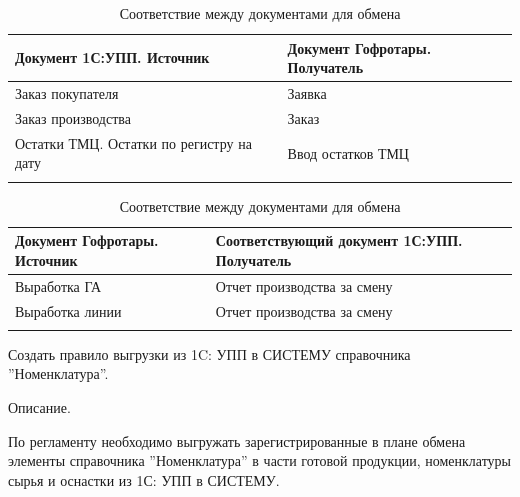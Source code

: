 \begin{longtable}{|p{70mm}|p{70mm}|}
\hline
\parbox[c][19mm]{55mm}{\centering Документ 1С:УПП. Источник} & \parbox[c]{55mm}{\centering Документ Гофротары. Получатель}  \\
\hline
\parbox[c][6mm]{60mm}{Заказ покупателя} & Заявка \\
\hline
\parbox[c][6mm]{60mm}{Заказ производства} & Заказ  \\
\hline
\parbox[c][12mm]{60mm}{Остатки ТМЦ. Остатки по регистру на дату} & Ввод остатков ТМЦ  \\
\hline
\caption{Соответствие между документами для обмена}\label{tab:exchange2}
\end{longtable}  
\normalsize




\begin{longtable}{|p{70mm}|p{70mm}|}
\hline
\parbox[c][19mm]{55mm}{\centering Документ Гофротары. Источник} & \parbox[c]{55mm}{\centering Соответствующий документ 1С:УПП. Получатель}  \\
\hline
\parbox[c][6mm]{60mm}{Выработка ГА} & Отчет производства за смену \\
\hline
\parbox[c][6mm]{60mm}{Выработка линии} & Отчет производства за смену \\
\hline
\caption{Соответствие между документами для обмена}\label{tab:exchange3}
\end{longtable}  
\normalsize










Создать правило выгрузки из 1C: УПП в СИСТЕМУ справочника ''Номенклатура''.


Описание.

По регламенту необходимо выгружать зарегистрированные в плане обмена элементы справочника ''Номенклатура'' в части готовой продукции, номенклатуры сырья и оснастки из 1С: УПП в СИСТЕМУ.

